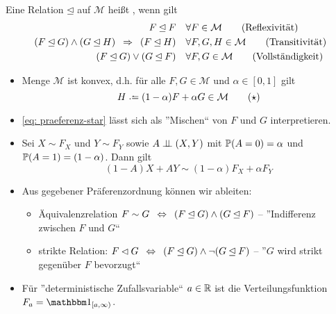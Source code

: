 \begin{*definition}
	Eine Relation $\unlhd$ auf $\mathcal{M}$ heißt , wenn gilt
	\begin{align*}
		F \unlhd F \quad &\forall F \in \mathcal{M} \tag{Reflexivität} \\
		(F \unlhd G) \land (G \unlhd H) \follows (F \unlhd H) \quad &\forall F, G, H \in \mathcal{M} \tag{Transitivität} \\
		(F \unlhd G) \lor (G \unlhd F) \quad &\forall F,G \in \mathcal{M} \tag{Vollständigkeit}
	\end{align*}
\end{*definition}
\begin{*bemerkung}
	\begin{itemize}[nolistsep]
		\item Menge $\mathcal{M}$ ist konvex, d.h. für alle $F,G \in \mathcal{M}$ und $\alpha \in [0,1]$ gilt
		\begin{equation*}
			H \defeq (1-\alpha) F + \alpha G \in \mathcal{M}
			\tag{$\star$} \label{eq: praeferenz-star}
		\end{equation*}
		\item \eqref{eq: praeferenz-star} lässt sich als ''Mischen`` von $F$ und $G$ interpretieren.
		\item Sei $X \sim F_X$ und $Y \sim F_Y$ sowie $A \upmodels (X,Y)$ mit $\P(A = 0) = \alpha$ und $\P(A = 1) = (1-\alpha)$. Dann gilt
		\begin{equation*}
			(1-A) X + A Y \sim (1-\alpha) F_X + \alpha F_Y
		\end{equation*}
		\item Aus gegebener Präferenzordnung können wir ableiten:
		\begin{itemize}
			\item Äquivalenzrelation $F \sim G \equivalent (F \unlhd G) \land (G \unlhd F)$ -- ''Indifferenz zwischen $F$ und $G$``
			\item strikte Relation: $F \lhd G \equivalent (F \unlhd G) \land \lnot (G \unlhd F)$ -- ''$G$ wird strikt gegenüber $F$ bevorzugt``
		\end{itemize}
		\item Für ''deterministische Zufallsvariable`` $a \in \R$ ist die Verteilungsfunktion $F_a = \one_{[a,\infty)}$.
	\end{itemize}
\end{*bemerkung}

